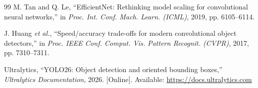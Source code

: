 \documentclass[conference]{IEEEtran}
\begin{document}
\begin{thebibliography}{99}
M. Tan and Q. Le, ``EfficientNet: Rethinking model scaling for convolutional neural
networks,'' in \emph{Proc. Int. Conf. Mach. Learn. (ICML)}, 2019, pp. 6105--6114.

J. Huang \emph{et al.}, ``Speed/accuracy trade-offs for modern convolutional object
detectors,'' in \emph{Proc. IEEE Conf. Comput. Vis. Pattern Recognit. (CVPR)}, 2017,
pp. 7310--7311.

Ultralytics, ``YOLO26: Object detection and oriented bounding boxes,''
\emph{Ultralytics Documentation}, 2026. [Online].
Available: \url{https://docs.ultralytics.com}

\end{thebibliography}
\end{document}
